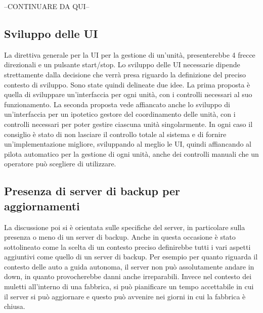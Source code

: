 --CONTINUARE DA QUI--

\subsection{Sviluppo delle UI} 
La direttiva generale per la UI per la gestione di un'unità, presenterebbe 4 frecce direzionali e un pulsante start/stop.
Lo sviluppo delle UI necessarie dipende strettamente dalla decisione che verrà presa riguardo la definizione del preciso contesto di sviluppo. Sono state quindi delineate due idee.
La prima proposta è quella di sviluppare un'interfaccia per ogni unità, con i controlli necessari al suo funzionamento. 
La seconda proposta vede affiancato anche lo sviluppo di un'interfaccia per un ipotetico gestore del coordinamento delle unità, con i controlli necessari per poter gestire ciascuna unità singolarmente.
In ogni caso il consiglio è stato di non lasciare il controllo totale al sistema e di fornire un'implementazione migliore, sviluppando al meglio le UI, quindi affiancando al pilota automatico per la gestione di ogni unità, anche dei controlli manuali che un operatore può scegliere di utilizzare. 
 
\subsection{Presenza di server di backup per aggiornamenti}
La discussione poi si è orientata sulle specifiche del server, in particolare sulla presenza o meno di un server di backup. Anche in questa occasione è stato sottolineato come la scelta di un contesto preciso definirebbe tutti i vari aspetti aggiuntivi come quello di un server di backup. 
Per esempio per quanto riguarda il contesto delle auto a guida autonoma, il server non può assolutamente andare in down, in quanto provocherebbe danni anche irreparabili. Invece nel contesto dei muletti all'interno di una fabbrica, si può pianificare un tempo accettabile in cui il server si può aggiornare e questo può avvenire nei giorni in cui la fabbrica è chiusa. 

